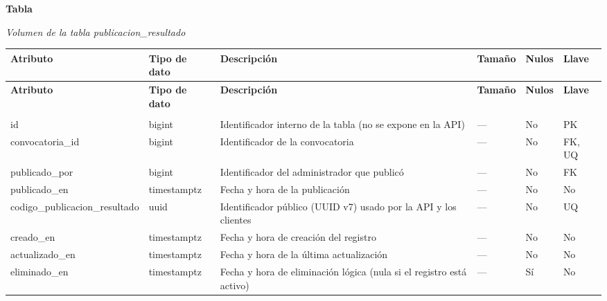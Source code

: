 \label{tab:volumen_publicacion_resultado}
\noindent\textbf{Tabla~\thetable}\par\nopagebreak
\noindent\textit{Volumen de la tabla publicacion\_\allowbreak{}resultado}\par\nopagebreak
\begingroup\small\linespread{1}\selectfont\setlength{\tabcolsep}{4pt}
\begin{longtable}{>{\raggedright\arraybackslash}p{3.4cm} >{\raggedright\arraybackslash}p{2.5cm} >{\raggedright\arraybackslash}p{4.8cm} >{\centering\arraybackslash}p{1.6cm}>{\centering\arraybackslash}p{1.1cm} >{\centering\arraybackslash}p{1.3cm}}
\toprule
\textbf{Atributo} & \textbf{Tipo de dato} & \textbf{Descripción} & \textbf{Tamaño} & \textbf{Nulos} & \textbf{Llave} \\
\midrule
\endfirsthead
\toprule
\textbf{Atributo} & \textbf{Tipo de dato} & \textbf{Descripción} & \textbf{Tamaño} & \textbf{Nulos} & \textbf{Llave} \\
\midrule
\endhead
\endfoot
\bottomrule
\multicolumn{6}{l}{\textit{Nota.} Elaboración propia.} \\
\endlastfoot
id & bigint & Identificador interno de la tabla (no se expone en la API) & — & No & PK \\
convocatoria\_\allowbreak{}id & bigint & Identificador de la convocatoria & — & No & FK, UQ \\
publicado\_\allowbreak{}por & bigint & Identificador del administrador que publicó & — & No & FK \\
publicado\_\allowbreak{}en & timestamptz & Fecha y hora de la publicación & — & No & No \\
codigo\_\allowbreak{}publicacion\_\allowbreak{}resultado & uuid & Identificador público (UUID v7) usado por la API y los clientes & — & No & UQ \\
creado\_\allowbreak{}en & timestamptz & Fecha y hora de creación del registro & — & No & No \\
actualizado\_\allowbreak{}en & timestamptz & Fecha y hora de la última actualización & — & No & No \\
eliminado\_\allowbreak{}en & timestamptz & Fecha y hora de eliminación lógica (nula si el registro está activo) & — & Sí & No \\
\end{longtable}
\endgroup
\addtocounter{table}{-1}

